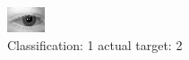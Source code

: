 \begin{figure}[h!]
\begin{center}
\includegraphics[width=0.60\columnwidth]{figures/ID412_class_1_target_2.png}
\end{center}
\caption{ Classification: 1 actual target: 2}
\label{fig:ID412_class_1_target_2}
\end{figure}
